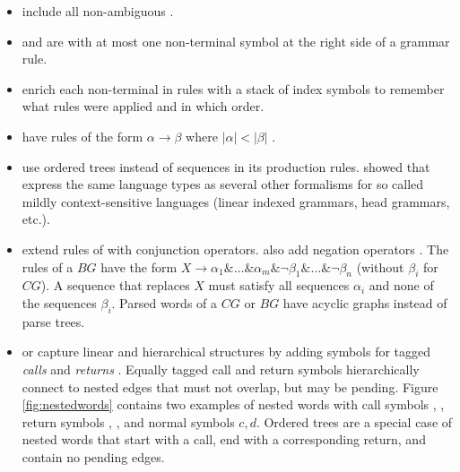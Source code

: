 \begin{itemize}
\item {} 
  include all non-ambiguous .
\item {} and 
   are  with 
  at most one non-terminal symbol at the right side of a grammar rule.
\item {} enrich each non-terminal in
   rules with a stack of index symbols to remember what 
  rules were applied and in which order.
\item {} have rules of the 
  form $\alpha \to \beta$ where $|\alpha| < |\beta|$ 
  \cite{McNaughton1999}.
\item {} use ordered trees instead
  of sequences in its production rules. \textcite{VijayShanker1994} showed 
  that  express the same language types as several other formalisms 
  for so called mildly context-sensitive languages (linear indexed grammars, 
  head grammars, etc.).
\item {} extend rules of  with 
  conjunction operators.  also add
  negation operators \cite{Okhotin2010}. The rules of a $BG$ have the form
$X \to \alpha_1 \& \ldots \& \alpha_m \&
\lnot\beta_1 \& \ldots \& \lnot\beta_n $
 (without $\beta_i$ for $CG$). A
  sequence that replaces $X$ must satisfy all sequences $\alpha_i$ and none
  of the sequences $\beta_i$. Parsed words of a $CG$ or $BG$ have acyclic 
  graphs instead of parse trees.%
\item {} or 
  capture linear and hierarchical structures by adding symbols for 
  tagged \emph{calls} and \emph{returns} \cite{Alur2009}. Equally
  tagged call and return symbols hierarchically connect to nested edges
  that must not overlap, but may be pending. Figure \ref{fig:nestedwords}
  contains two examples of nested words with call symbols , ,
  return symbols , , and normal symbols $c,d$.
  Ordered trees are a special case of nested words that start with a
  call, end with a corresponding return, and contain no pending edges.
\end{itemize}

